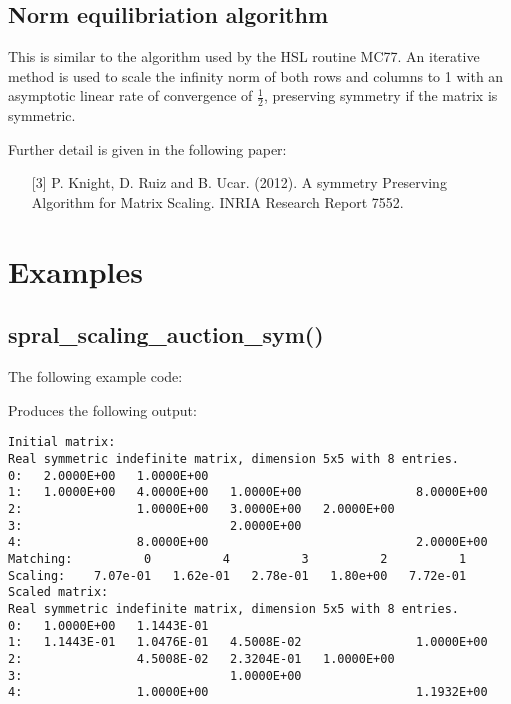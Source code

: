 \subsection{Norm equilibriation algorithm}
This is similar to the algorithm used by the HSL routine MC77.
An iterative method
is used to scale the infinity norm of both rows and columns to 1 with an asymptotic linear rate of convergence of $\frac{1}{2}$, preserving symmetry if the matrix is symmetric.

\noindent
Further detail is given in the following paper:
\begin{itemize}
   \item[{[3]}] P. Knight, D. Ruiz and B. Ucar. (2012). A symmetry Preserving Algorithm for Matrix Scaling. INRIA Research Report 7552.
\end{itemize}



\section{Examples} \label{examples}

\subsection{spral\_scaling\_auction\_sym()}
The following example code:

Produces the following output:
\begin{verbatim}
Initial matrix:
Real symmetric indefinite matrix, dimension 5x5 with 8 entries.
0:   2.0000E+00   1.0000E+00                                       
1:   1.0000E+00   4.0000E+00   1.0000E+00                8.0000E+00
2:                1.0000E+00   3.0000E+00   2.0000E+00             
3:                             2.0000E+00                          
4:                8.0000E+00                             2.0000E+00
Matching:          0          4          3          2          1
Scaling:    7.07e-01   1.62e-01   2.78e-01   1.80e+00   7.72e-01
Scaled matrix:
Real symmetric indefinite matrix, dimension 5x5 with 8 entries.
0:   1.0000E+00   1.1443E-01                                       
1:   1.1443E-01   1.0476E-01   4.5008E-02                1.0000E+00
2:                4.5008E-02   2.3204E-01   1.0000E+00             
3:                             1.0000E+00                          
4:                1.0000E+00                             1.1932E+00
\end{verbatim}


